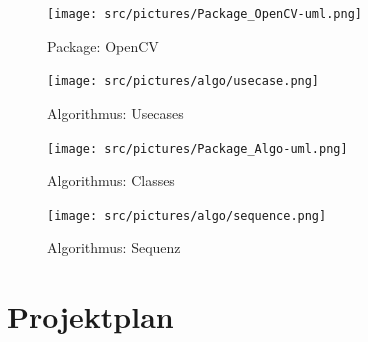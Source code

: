 \begin{appendix}
        \begin{figure}[ht]
            \centering
            \texttt{[image: src/pictures/Package\_OpenCV-uml.png]}
            \caption{Package: OpenCV}
            \label{img:package:ocv}
        \end{figure}

        \cleardoubleemptypage

        \begin{figure}[ht]
            \centering
            \texttt{[image: src/pictures/algo/usecase.png]}
            \caption{Algorithmus: Usecases}
            \label{img:algo:usecases}
        \end{figure}

        \cleardoubleemptypage

        \begin{figure}[ht]
            \centering
            \texttt{[image: src/pictures/Package\_Algo-uml.png]}
            \caption{Algorithmus: Classes}
            \label{img:algo:classes}
        \end{figure}

        \cleardoubleemptypage

        \begin{figure}[ht]
            \centering
            \texttt{[image: src/pictures/algo/sequence.png]}
            \caption{Algorithmus: Sequenz}
            \label{img:algo:sequence}
        \end{figure}

    \chapter{Projektplan}

    
        \label{apx:projektplan}


\end{appendix}
